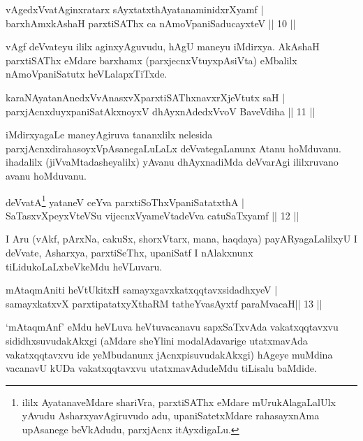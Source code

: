 
\begin{shl}
vAgedxVvatA\s ginxratarx sAyxtatxthA\s \s yatanaminidxrXyamf |\\
barxhAmx\s \s kAshaH parxtiSAThx ca nAmoVpaniSaducayxteV \hfill || 10 || 
\end{shl}

\begin{artha}
vAgf deVvateyu ililx aginxyAguvudu, hAgU maneyu iMdirxya.  AkAshaH parxtiSAThx eMdare barxhamx (parxjecnxVtuyxpAsiVta) eMbalilx nAmoVpaniSatutx heVLalapxTiTxde.
\end{artha}


\begin{shl}
karaNAyatanAnedxVvAnasxvXparxtiSAThxnavxrXjeVtutx saH |\\
parxjAcnxduyxpaniSatAkxnoyxV dhAyxnAdedxVvoV BaveVdiha \hfill || 11 || 
\end{shl}

\begin{artha}
iMdirxyagaLe maneyAgiruva tananxlilx nelesida parxjAcnxdi\break rahasoyxVpAsanegaLuLaLx deVvategaLanunx Atanu hoMduvanu. ihadalilx (jiVvaMtadasheyalilx) yAvanu dhAyxnadiMda deVvarAgi ililxruvano avanu hoMduvanu.
\end{artha}

\begin{shl}
deVvatA\s\footnote{ililx AyatanaveMdare shariVra, parxtiSAThx eMdare mUrukAlagaLalUlx yAvudu AsharxyavAgiruvudo adu, upaniSatetxMdare rahasayxnAma upAsanege beVkAdudu, parxjAcnx itAyxdigaLu. } yataneV ceYva parxtiSoThxVpaniSatatxthA |\\
SaTasxvXpeyxVteVSu vijecnxVyameVtadeVva catuSaTxyamf \hfill || 12 || 
\end{shl}

\begin{artha}
I Aru (vAkf, pArxNa, cakuSx, shorxVtarx, mana, haqdaya) payARyagaLalilxyU I deVvate, Asharxya, parxtiSeThx, upaniSatf I nAlakxnunx tiLidukoLaLxbeVkeMdu heVLuvaru.
\end{artha}

\begin{shl}
mAtaqmAniti heVtUkitxH samayxgavxkatxqqtavxsidadhxyeV |\\
samayxkatxvX parxtipatatxyXthaRM tatheYvasAyxtf paraMvacaH\hfill || 13 ||
\end{shl}

\begin{artha}
`mAtaqmAnf' eMdu heVLuva heVtuvacanavu sapxSaTxvAda vakatxqqtavxvu sididhxsuvudakAkxgi (aMdare sheYlini modalAdavarige utatxmavAda vakatxqqtavxvu ide yeMbudanunx jAcnxpisuvudakAkxgi) hAgeye muMdina vacanavU kUDa vakatxqqtavxvu utatxmavAdudeMdu tiLisalu baMdide.
\end{artha}

